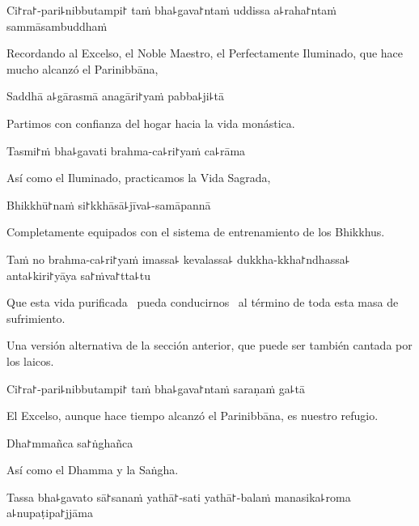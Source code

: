 Ci꜓ra꜓-pari꜕nibbutampi꜓ taṁ bha꜕gava꜓ntaṁ uddissa a꜕raha꜓ntaṁ sammāsambuddhaṁ

\begin{english}
  Recordando al Excelso, el Noble Maestro, el Perfectamente Iluminado, que hace mucho alcanzó el Parinibbāna,
\end{english}

Saddhā a꜕gārasmā anagāri꜓yaṁ pabba꜕ji꜕tā

\begin{english}
  Partimos con confianza del hogar hacia la vida monástica.
\end{english}

Tasmi꜓ṁ bha꜕gavati brahma-ca꜕ri꜓yaṁ ca꜕rāma

\begin{english}
  Así como el Iluminado, practicamos la Vida Sagrada,
\end{english}

Bhikkhū꜓naṁ si꜓kkhāsā꜕jīva꜕-samāpannā

\begin{english}
  Completamente equipados con el sistema de entrenamiento de los Bhikkhus.
\end{english}

\clearpage

Taṁ no brahma-ca꜕ri꜓yaṁ imassa꜕ kevalassa꜕ dukkha-kkha꜓ndhassa꜕ anta꜕kiri꜓yāya sa꜓ṁva꜓tta꜕tu

\begin{english}
  Que esta vida purificada \pause\ pueda conducirnos \pause\ al término de toda esta masa de sufrimiento.
\end{english}

\begin{instruction}
  Una versión alternativa de la sección anterior, que puede ser también cantada por los laicos.
\end{instruction}

Ci꜓ra꜓-pari꜕nibbutampi꜓ taṁ bha꜕gava꜓ntaṁ saraṇaṁ ga꜕tā

\begin{english}
  El Excelso, aunque hace tiempo alcanzó el Parinibbāna, es nuestro refugio.
\end{english}

Dha꜓mmañca sa꜓ṅghañca

\begin{english}
  Así como el Dhamma y la Saṅgha.
\end{english}

Tassa bha꜕gavato sā꜓sanaṁ yathā꜓-sati yathā꜓-balaṁ manasika꜕roma a꜕nupaṭipa꜓jjāma

